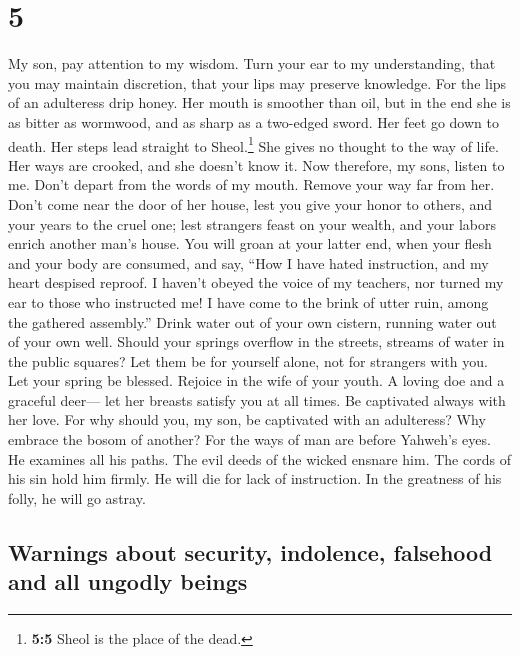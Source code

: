\hypertarget{section-4}{%
\section{5}\label{section-4}}

 My son, pay attention to my wisdom. Turn your ear to my
understanding,  that you may maintain discretion, that
your lips may preserve knowledge.  For the lips of an
adulteress drip honey. Her mouth is smoother than oil, 
but in the end she is as bitter as wormwood, and as sharp as a two-edged
sword.  Her feet go down to death. Her steps lead straight
to Sheol.\footnote{\textbf{5:5} Sheol is the place of the dead.}
 She gives no thought to the way of life. Her ways are
crooked, and she doesn't know it.  Now therefore, my sons,
listen to me. Don't depart from the words of my mouth. 
Remove your way far from her. Don't come near the door of her house,
 lest you give your honor to others, and your years to the
cruel one;  lest strangers feast on your wealth, and your
labors enrich another man's house.  You will groan at
your latter end, when your flesh and your body are consumed,
 and say, ``How I have hated instruction, and my heart
despised reproof.  I haven't obeyed the voice of my
teachers, nor turned my ear to those who instructed me! 
I have come to the brink of utter ruin, among the gathered assembly.''
 Drink water out of your own cistern, running water out
of your own well.  Should your springs overflow in the
streets, streams of water in the public squares?  Let
them be for yourself alone, not for strangers with you. 
Let your spring be blessed. Rejoice in the wife of your youth.
 A loving doe and a graceful deer--- let her breasts
satisfy you at all times. Be captivated always with her love.
 For why should you, my son, be captivated with an
adulteress? Why embrace the bosom of another?  For the
ways of man are before Yahweh's eyes. He examines all his paths.
 The evil deeds of the wicked ensnare him. The cords of
his sin hold him firmly.  He will die for lack of
instruction. In the greatness of his folly, he will go astray.

\hypertarget{warnings-about-security-indolence-falsehood-and-all-ungodly-beings}{%
\subsection{Warnings about security, indolence, falsehood and all
ungodly
beings}\label{warnings-about-security-indolence-falsehood-and-all-ungodly-beings}}

